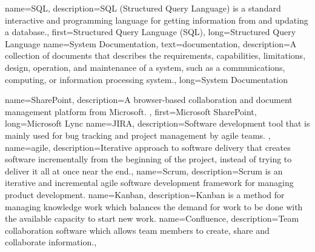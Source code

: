 
{
	name={SQL},
	description={SQL (Structured Query Language) is a standard interactive and programming language for getting information from and updating a database.},
	first={Structured Query Language (SQL)},
	long={Structured Query Language}
}
{
	name={System Documentation},
	text={documentation},
	description={A collection of documents that describes the requirements, \newline capabilities, limitations, design, operation, and maintenance of a system, such as a communications, computing, or information processing system.},
	long={System Documentation}
}

{
	name={SharePoint},
	description={A browser-based collaboration and document management platform from Microsoft. },
	first={Microsoft SharePoint},
	long={Microsoft Lync}
}
{
	name={JIRA},
	description={Software development tool  that is mainly used for bug tracking and project management by \gls{agile} teams. },
}
{
	name={agile},
	description={Iterative approach to software delivery that creates software incrementally from the beginning of the project, instead of trying to deliver it all at once near the end.},
}
{
	name={Scrum},
	description={Scrum is an iterative and incremental agile software development framework for managing product development.}
}
{
	name={Kanban},
	description={Kanban is a method for managing knowledge work which balances the demand for work to be done with the available capacity to start new work.}
}
{
	name={Confluence},
	description={Team collaboration software which allows team members to create, share and collaborate information.},
}


